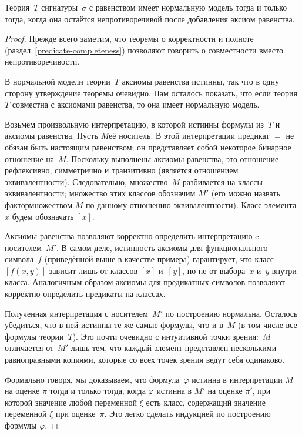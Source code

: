 \begin{theorem}
%
        \label{normal-models}%
Тео\-рия~$T$ сигнатуры~$\sigma$ с равенством имеет нормальную
модель тогда и только тогда, когда она остаётся непротиворечивой
после добавления аксиом равенства.
\end{theorem}

\begin{proof}
Прежде всего заметим, что теоремы о корректности и полноте
(раздел~\ref{predicate-completeness})
позволяют говорить о совместности вместо непротиворечивости.

В нормальной модели теории~$T$ аксиомы равенства
истинны, так что в одну сторону утверждение теоремы очевидно.
Нам осталось показать, что если теория $T$ совместна с аксиомами
равенства, то она имеет нормальную модель.

Возьмём произвольную интерпретацию, в которой истинны формулы
из~$T$ и аксиомы равенства. Пусть $M$\т её носитель. В этой
интерпретации предикат $=$ не обязан быть настоящим равенством;
он представляет собой некоторое бинарное отношение на~$M$.
Поскольку выполнены аксиомы равенства, это отношение
рефлексивно, симметрично и транзитивно (является отношением
эквивалентности). Следовательно, множество~$M$ разбивается на
классы эквивалентности; множество этих классов обозначим $M'$
(его можно назвать фактор\д множеством $M$ по данному отношению
эквивалентности). Класс элемента~$x$ будем обозначать $[x]$.

Аксиомы равенства позволяют корректно определить интерпретацию c
носителем~$M'$. В самом деле, истинность аксиомы для
функционального символа~$f$ (приведённой выше в качестве
примера) гарантирует, что класс $[f(x,y)]$ зависит лишь от
классов $[x]$ и~$[y]$, но не от выбора~$x$ и~$y$ внутри класса.
Аналогичным образом аксиомы для предикатных символов позволяют
корректно определить предикаты на классах.

Полученная интерпретация с носителем~$M'$ по построению
нормальна. Осталось убедиться, что в ней истинны те же самые
формулы, что и в~$M$ (в том числе все формулы теории~$T$). Это
почти очевидно с интуитивной точки зрения:~$M$ отличается
от~$M'$ лишь тем, что каждый элемент представлен несколькими
равноправными копиями, которые со всех точек зрения ведут себя
одинаково.

Формально говоря, мы доказываем, что формула~$\varphi$ истинна в
интерпретации $M$ на оценке $\pi$ тогда и только тогда, когда
$\varphi$ истинна в $M'$ на оценке $\pi'$, при которой значение
любой переменной $\xi$ есть класс, содержащий значение
переменной $\xi$ при оценке~$\pi$. Это легко сделать индукцией
по построению формулы $\varphi$.
\end{proof}


